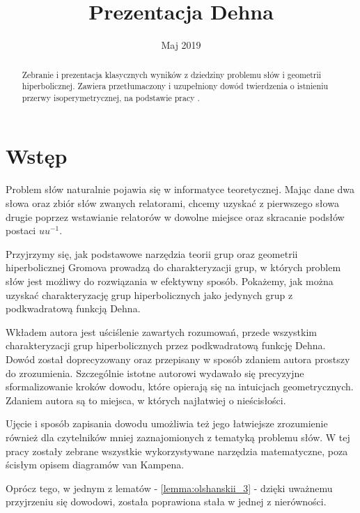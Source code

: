 \documentclass[licencjacka]{pracamgr}
\title{Prezentacja Dehna}
\date{Maj 2019}
\begin{document}
\maketitle

\begin{abstract}

Zebranie i prezentacja klasycznych wyników z dziedziny problemu słów i geometrii hiperbolicznej. Zawiera przetłumaczony i uzupełniony dowód twierdzenia o istnieniu przerwy isoperymetrycznej, na podstawie pracy \cite{bib:subquadratic_isoperimetric_inequality}.

\end{abstract}

\tableofcontents


\chapter*{Wstęp}

Problem słów naturalnie pojawia się w informatyce teoretycznej. Mając dane dwa słowa oraz zbiór słów zwanych relatorami, chcemy uzyskać z pierwszego słowa drugie poprzez wstawianie relatorów w dowolne miejsce oraz skracanie podsłów postaci $uu^{-1}$.

Przyjrzymy się, jak podstawowe narzędzia teorii grup oraz geometrii hiperbolicznej Gromova prowadzą do charakteryzacji grup, w których problem słów jest możliwy do rozwiązania w efektywny sposób. Pokażemy, jak można uzyskać charakteryzację grup hiperbolicznych jako jedynych grup z podkwadratową funkcją Dehna.

Wkładem autora jest uściślenie zawartych rozumowań, przede wszystkim charakteryzacji grup hiperbolicznych przez podkwadratową funkcję Dehna. Dowód został doprecyzowany oraz przepisany w sposób zdaniem autora prostszy do zrozumienia. Szczególnie istotne autorowi wydawało się precyzyjne sformalizowanie kroków dowodu, które opierają się na intuicjach geometrycznych. Zdaniem autora są to miejsca, w których najłatwiej o nieścisłości.

Ujęcie i sposób zapisania dowodu umożliwia też jego łatwiejsze zrozumienie również dla czytelników mniej zaznajomionych z tematyką problemu słów. W tej pracy zostały zebrane wszystkie wykorzystywane narzędzia matematyczne, poza ścisłym opisem diagramów van Kampena.

Oprócz tego, w jednym z lematów - \ref{lemma:olshanskii_3} - dzięki uważnemu przyjrzeniu się dowodowi, została poprawiona stała w jednej z nierówności.
\end{document}

